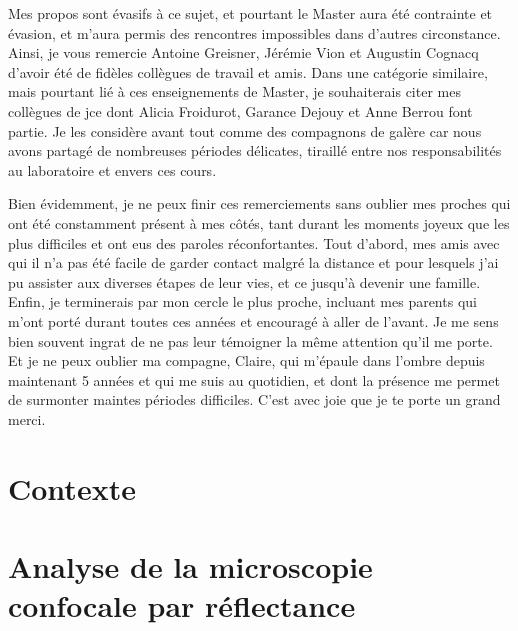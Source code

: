 \documentclass[english,standardlists]{spimubphdthesis}
\begin{document}
Mes propos sont évasifs à ce sujet, et pourtant le Master aura été contrainte et évasion, et m'aura permis des rencontres impossibles dans d'autres circonstance. Ainsi, je vous remercie Antoine Greisner, Jérémie Vion et Augustin Cognacq d'avoir été de fidèles collègues de travail et amis. Dans une catégorie similaire, mais pourtant lié à ces enseignements de Master, je souhaiterais citer mes collègues de \gls{jce} dont Alicia Froidurot, Garance Dejouy et Anne Berrou font partie. Je les considère avant tout comme des compagnons de galère car nous avons partagé de nombreuses périodes délicates, tiraillé entre nos responsabilités au laboratoire et envers ces cours.\par
 
Bien évidemment, je ne peux finir ces remerciements sans oublier mes proches qui ont été constamment présent à mes côtés, tant durant les moments joyeux que les plus difficiles et ont eus des paroles réconfortantes. Tout d'abord, mes amis avec qui il n'a pas été facile de garder contact malgré la distance et pour lesquels j'ai pu assister aux diverses étapes de leur vies, et ce jusqu'à devenir une famille. Enfin, je terminerais par mon cercle le plus proche, incluant mes parents qui m'ont porté durant toutes ces années et encouragé à aller de l'avant. Je me sens bien souvent ingrat de ne pas leur témoigner la même attention qu'il me porte. Et je ne peux oublier ma compagne, Claire, qui m'épaule dans l'ombre depuis maintenant 5 années et qui me suis au quotidien, et dont la présence me permet de surmonter maintes périodes difficiles. C'est avec joie que je te porte un grand merci.\par
		
\tableofcontents

\mainmatter
\renewcommand\chaptermark[1]{\markboth{\uppercase{#1}}{}}



\part{Contexte}
\label{part:contexte}





\part{Analyse de la microscopie confocale par réflectance}
\label{part:microscopy}




\end{document}
